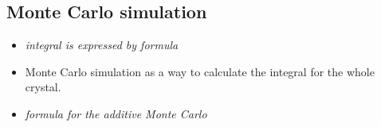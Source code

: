 \subsection{Monte Carlo simulation}
\label{subsec:monteCarlo}

\begin{itemize}

  \item \textit{integral is expressed by formula} \cite{ASE2010}

  \item Monte Carlo simulation as a way to calculate the integral for the whole
    crystal.

  \item \textit{formula for the additive Monte Carlo}

\end{itemize}






